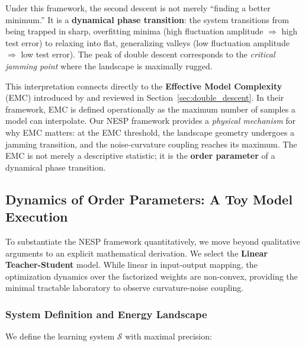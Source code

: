 \documentclass[
  journal=largetwo,
  year=2025,
  volume=37,
]{cup-journal}
\begin{document}
\begin{remark}
Under this framework, the second descent is not merely ``finding a better minimum.'' It is a \textbf{dynamical phase transition}: the system transitions from being trapped in sharp, overfitting minima (high fluctuation amplitude $\Rightarrow$ high test error) to relaxing into flat, generalizing valleys (low fluctuation amplitude $\Rightarrow$ low test error). The peak of double descent corresponds to the \textit{critical jamming point} where the landscape is maximally rugged.

This interpretation connects directly to the \textbf{Effective Model Complexity} (EMC) introduced by \cite{nakkiran_deep_2019} and reviewed in Section~\ref{sec:double_descent}. In their framework, EMC is defined operationally as the maximum number of samples a model can interpolate. Our NESP framework provides a \textit{physical mechanism} for why EMC matters: at the EMC threshold, the landscape geometry undergoes a jamming transition, and the noise-curvature coupling reaches its maximum. The EMC is not merely a descriptive statistic; it is the \textbf{order parameter} of a dynamical phase transition.
\end{remark}

\subsection{Dynamics of Order Parameters: A Toy Model Execution}\label{sec:toy_model}

To substantiate the NESP framework quantitatively, we move beyond qualitative arguments to an explicit mathematical derivation. We select the \textbf{Linear Teacher-Student} model. While linear in input-output mapping, the optimization dynamics over the factorized weights are non-convex, providing the minimal tractable laboratory to observe curvature-noise coupling.

\subsubsection{System Definition and Energy Landscape}

We define the learning system $\mathcal{S}$ with maximal precision:
\end{document}
